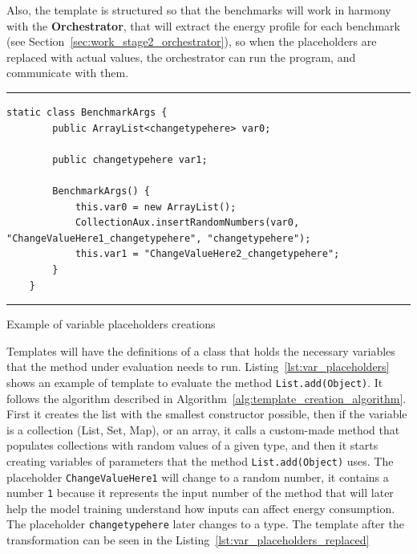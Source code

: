 Also, the template is structured so that the benchmarks will work in harmony with the \textbf{Orchestrator}, that will extract the energy profile for each benchmark (see Section~\ref{sec:work_stage2_orchestrator}), so when the placeholders are replaced with actual values, the orchestrator can run the program, and communicate with them.


\begin{listing}[htbp]
\noindent\rule{\linewidth}{0.4pt}
\begin{verbatim}
static class BenchmarkArgs {
        public ArrayList<changetypehere> var0;

        public changetypehere var1;

        BenchmarkArgs() {
            this.var0 = new ArrayList();
            CollectionAux.insertRandomNumbers(var0, "ChangeValueHere1_changetypehere", "changetypehere");
            this.var1 = "ChangeValueHere2_changetypehere";
        }
    }
\end{verbatim}
\noindent\rule{\linewidth}{0.4pt}
\caption{Example of variable placeholders creations}            
\label{lst:var_placeholders}
\end{listing}

Templates will have the definitions of a class that holds the necessary variables that the method under evaluation needs to run. Listing~\ref{lst:var_placeholders} shows an example of template to evaluate the method \texttt{List.add(Object)}. It follows the algorithm described in Algorithm~\ref{alg:template_creation_algorithm}. First it creates the list with the smallest constructor possible, then if the variable is a collection (List, Set, Map), or an array, it calls a custom-made method that populates collections with random values of a given type, and then it starts creating variables of parameters that the method \texttt{List.add(Object)} uses. The placeholder \texttt{ChangeValueHere1} will change to a random number, it contains a number \texttt{1} because it represents the input number of the method that will later help the model training understand how inputs can affect energy consumption. The placeholder \texttt{changetypehere} later changes to a type. The template after the transformation can be seen in the Listing~\ref{lst:var_placeholders_replaced}



